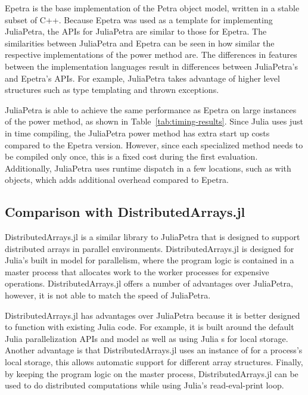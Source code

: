 \documentclass[acmsmall]{acmart}
\newcommand{\snippet}[1]{\texttt{\detokenize{#1}}}
\begin{document}
Epetra is the base implementation of the Petra object model,
written in a stable subset of C++. \cite{OverviewOfTrilinos}
Because Epetra was used as a template for implementing JuliaPetra,
the APIs for JuliaPetra are similar to those for Epetra.
The similarities between JuliaPetra and Epetra can be seen in how similar the respective implementations
of the power method are.
The differences in features between the implementation languages result in differences
between JuliaPetra's and Epetra's APIs.
For example, JuliaPetra takes advantage of higher level structures
such as type templating and thrown exceptions.

JuliaPetra is able to achieve the same performance as Epetra on large instances of the power method,
as shown in Table~\ref{tab:timing-results}.
Since Julia uses just in time compiling, the JuliaPetra power method has extra start up costs compared to
the Epetra version. However, since each specialized method needs to be compiled only once,
this is a fixed cost during the first evaluation.
Additionally, JuliaPetra uses runtime dispatch in a few locations, such as with
\snippet{Comm} objects, which adds additional overhead compared to Epetra.

\subsection{Comparison with DistributedArrays.jl}

DistributedArrays.jl is a similar library to JuliaPetra that is designed to support
distributed arrays in parallel environments. \cite{DAGithub}
DistributedArrays.jl is designed for Julia's built in model for parallelism, where the program logic is
contained in a master process that allocates work to the worker processes for expensive operations.
\cite{JuliaFreshApproach}
DistributedArrays.jl offers a number of advantages over JuliaPetra, however, it is not able to
match the speed of JuliaPetra.

DistributedArrays.jl has advantages over JuliaPetra because it is better designed to function with
existing Julia code.
For example, it is built around the default Julia parallelization APIs and model as well as using
Julia \snippet{AbstractArray}s for local storage.
Another advantage is that DistributedArrays.jl uses an instance of \snippet{AbstractArray}
for a process's local storage, this allows automatic support for different array structures.
Finally, by keeping the program logic on the master process, DistributedArrays.jl can be used to
do distributed computations while using Julia's read-eval-print loop.
\end{document}
